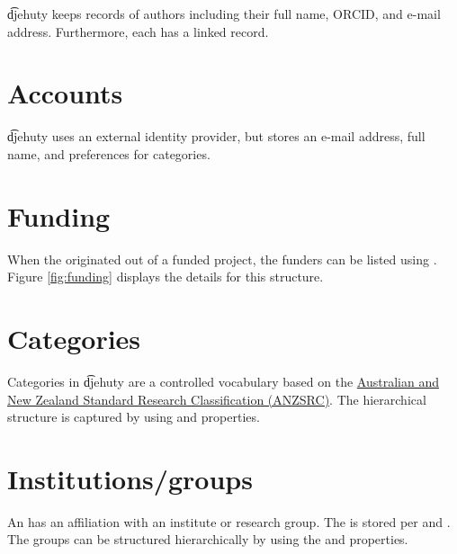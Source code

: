   \t{djehuty} keeps records of authors including their full name, ORCID,
  and e-mail address.  Furthermore, each  has a linked
   record.


\section{Accounts}

  \t{djehuty} uses an external identity provider, but stores an e-mail address,
  full name, and preferences for categories.


\section{Funding}

  When the  originated out of a funded project, the funders
  can be listed using .  Figure \ref{fig:funding} displays
  the details for this structure.


\section{Categories}

  Categories in \t{djehuty} are a controlled vocabulary based on the
  \href{https://www.abs.gov.au/Ausstats/abs@.nsf/Latestproducts/4AE1B46AE2048A28CA25741800044242}%
  {Australian and New Zealand Standard Research Classification (ANZSRC)}.  The
  hierarchical structure is captured by using  and 
  properties.


\section{Institutions/groups}

  An  has an affiliation with an institute or research group.
  The  is stored per  and
  .  The groups can be structured hierarchically by
  using the  and  properties.

